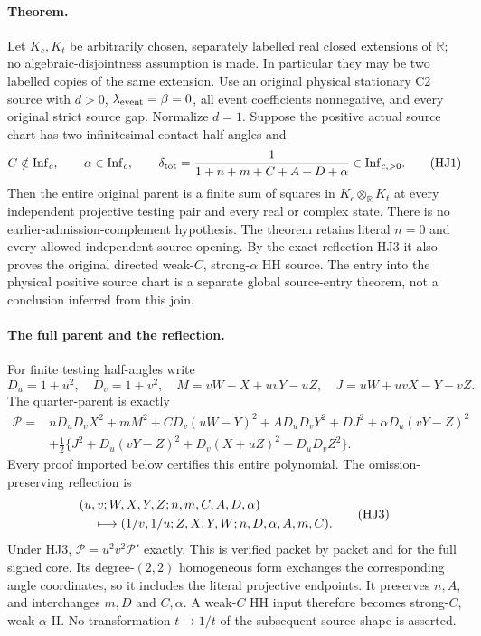 \paragraph{Theorem.}
Let \(K_c,K_t\) be arbitrarily chosen, separately labelled
real closed extensions of \(\mathbb R\); no
algebraic-disjointness assumption is made.  In particular
they may be two labelled copies of the same extension.
Use an original physical stationary C2 source
with \(d>0\), \(\lambda_{\rm event}=\beta=0\), all event
coefficients nonnegative, and every original strict source gap.
Normalize \(d=1\).  Suppose the positive actual source chart
has two infinitesimal contact half-angles and
\[
 C\notin\mathrm{Inf}_c,\qquad
 \alpha\in\mathrm{Inf}_c,\qquad
 \delta_{\rm tot}
   =\frac1{1+n+m+C+A+D+\alpha}\in\mathrm{Inf}_{c,>0}.
 \tag{HJ1}
\]
Then the entire original parent is a finite sum of squares in
\(K_c\otimes_{\mathbb R}K_t\) at every independent projective
testing pair and every real or complex state.
There is no earlier-admission-complement hypothesis.
The theorem retains literal \(n=0\) and every allowed
independent source opening.
By the exact reflection HJ3 it also proves the original
directed weak-\(C\), strong-\(\alpha\) HH source.
The entry into the physical positive source chart is a
separate global source-entry theorem, not a conclusion
inferred from this join.

\paragraph{The full parent and the reflection.}
For finite testing half-angles write
\[
 D_u=1+u^2,\quad D_v=1+v^2,\quad
 M=vW-X+uvY-uZ,\quad J=uW+uvX-Y-vZ .
\]
The quarter-parent is exactly
\[
\begin{split}
 \mathcal P={}&nD_uD_vX^2+mM^2+CD_v(uW-Y)^2
       +AD_uD_vY^2+DJ^2+\alpha D_u(vY-Z)^2\\
 &+\tfrac12\{J^2+D_u(vY-Z)^2+D_v(X+uZ)^2-D_uD_vZ^2\}.
\end{split}
\tag{HJ2}
\]
Every proof imported below certifies this entire polynomial.
The omission-preserving reflection is
\[
\begin{split}
 &(u,v;W,X,Y,Z;n,m,C,A,D,\alpha)\\
 &\hspace{4mm}\longmapsto
 (1/v,1/u;Z,X,Y,W;n,D,\alpha,A,m,C).
\end{split}
\tag{HJ3}
\]
Under HJ3, \(\mathcal P=u^2v^2\mathcal P'\) exactly.
This is verified packet by packet and for the full signed
core.  Its degree-\((2,2)\) homogeneous form exchanges
the corresponding angle coordinates, so it includes
the literal projective endpoints.
It preserves \(n,A\), and interchanges \(m,D\) and
\(C,\alpha\).  A weak-\(C\) HH input therefore becomes
strong-\(C\), weak-\(\alpha\) II.
No transformation \(t\mapsto1/t\) of the subsequent
source shape is asserted.

